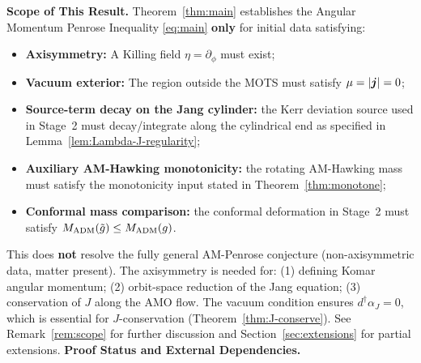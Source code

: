\textbf{Scope of This Result.}
Theorem~\ref{thm:main} establishes the Angular Momentum Penrose Inequality \eqref{eq:main} \textbf{only} for initial data satisfying:
\begin{itemize}[leftmargin=1.5em, itemsep=1pt]
    \item \textbf{Axisymmetry:} A Killing field $\eta = \partial_\phi$ must exist;
    \item \textbf{Vacuum exterior:} The region outside the MOTS must satisfy $\mu = |\boldsymbol{j}| = 0$;
    \item \textbf{Source-term decay on the Jang cylinder:} the Kerr deviation source used in Stage~2 must decay/integrate along the cylindrical end as specified in Lemma~\ref{lem:Lambda-J-regularity};
    \item \textbf{Auxiliary AM-Hawking monotonicity:} the rotating AM-Hawking mass must satisfy the monotonicity input stated in Theorem~\ref{thm:monotone};
    \item \textbf{Conformal mass comparison:} the conformal deformation in Stage~2 must satisfy $M_{\mathrm{ADM}}(\tilde{g})\le M_{\mathrm{ADM}}(g)$.
\end{itemize}
This does \textbf{not} resolve the fully general AM-Penrose conjecture (non-axisymmetric data, matter present). The axisymmetry is needed for: (1) defining Komar angular momentum; (2) orbit-space reduction of the Jang equation; (3) conservation of $J$ along the AMO flow. The vacuum condition ensures $d^\dagger\alpha_J = 0$, which is essential for $J$-conservation (Theorem~\ref{thm:J-conserve}). See Remark~\ref{rem:scope} for further discussion and Section~\ref{sec:extensions} for partial extensions.
\textbf{Proof Status and External Dependencies.}
